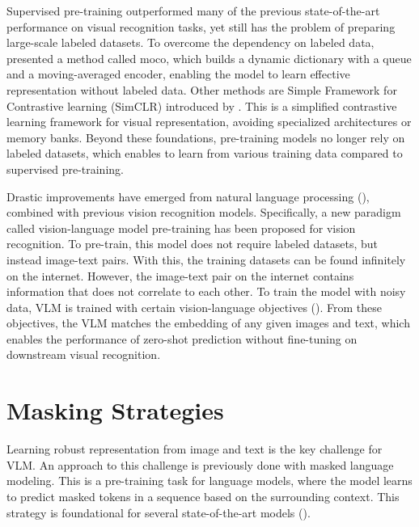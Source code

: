 Supervised pre-training outperformed many of the previous state-of-the-art performance on visual recognition tasks, yet still has the problem of preparing large-scale labeled datasets. To overcome the dependency on labeled data, \cite{he2020momentumcontrastunsupervisedvisual} presented a method called \acrfull{moco}, which builds a dynamic dictionary with a queue and a moving-averaged encoder, enabling the model to learn effective representation without labeled data. Other methods are Simple Framework for Contrastive learning (SimCLR) introduced by \cite{chen2020simpleframeworkcontrastivelearning}. This is a simplified contrastive learning framework for visual representation, avoiding specialized architectures or memory banks. Beyond these foundations, pre-training models no longer rely on labeled datasets, which enables to learn from various training data compared to supervised pre-training. 

Drastic improvements have emerged from natural language processing (\cite{devlin2018bert, brown2020language}), combined with previous vision recognition models. Specifically, a new paradigm called vision-language model pre-training has been proposed for vision recognition. To pre-train, this model does not require labeled datasets, but instead image-text pairs. With this, the training datasets can be found infinitely on the internet. However, the image-text pair on the internet contains information that does not correlate to each other. To train the model with noisy data, VLM is trained with certain vision-language objectives (\cite{radford2021learning, yu2022cocacontrastivecaptionersimagetext}). From these objectives, the VLM matches the embedding of any given images and text, which enables the performance of zero-shot prediction without fine-tuning on downstream visual recognition.


\section{Masking Strategies}
Learning robust representation from image and text is the key challenge for VLM. An approach to this challenge is previously done with masked language modeling. This is a pre-training task for language models, where the model learns to predict masked tokens in a sequence based on the surrounding context. This strategy is foundational for several state-of-the-art models (\cite{devlin2018bert, liu2020roberta}). 

